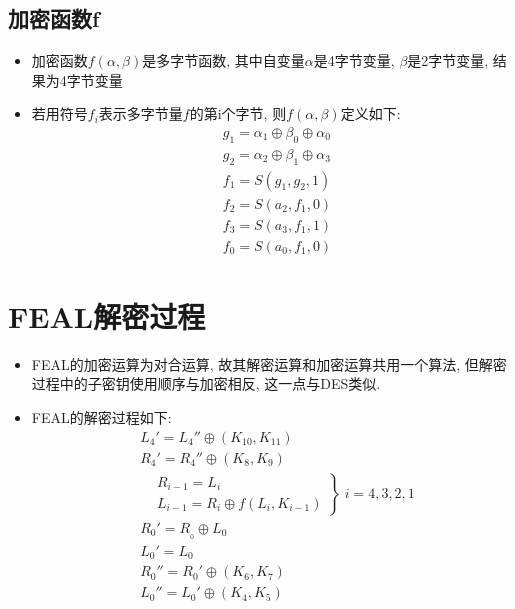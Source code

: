 \documentclass[UTF8]{ctexart}
\begin{document}
    \subsection{加密函数f}
    \begin{itemize}
        \item 加密函数$f(\alpha, \beta)$是多字节函数, 其中自变量$\alpha$是4字节变量, $\beta$是2字节变量, 结果为4字节变量
        \item 若用符号$f_i$表示多字节量$f$的第i个字节, 则$f(\alpha, \beta)$定义如下:
        $$
        \begin{aligned}
            &g_1=\alpha_1\oplus \beta_0\oplus \alpha_0\\
            &g_2=\alpha_2\oplus \beta_1\oplus \alpha_3\\
            &f_1=S(g_1, g_2, 1)\\
            &f_2=S(a_2, f_1, 0)\\
            &f_3=S(a_3, f_1, 1)\\
            &f_0=S(a_0, f_1, 0)
        \end{aligned}
        $$
    \end{itemize}

    \section{FEAL解密过程}
    \begin{itemize}
        \item FEAL的加密运算为对合运算, 故其解密运算和加密运算共用一个算法, 但解密过程中的子密钥使用顺序与加密相反, 这一点与DES类似.
        \item FEAL的解密过程如下:
        $$
        \begin{aligned}
            &L_4'=L_4''\oplus (K_{10}, K_{11})\\
            &R_4'=R_4''\oplus (K_{8}, K_{9})\\
            &\left. \begin{aligned} &R_{i-1}=L_i\\ &L_{i-1}=R_i\oplus f(L_i, K_{i-1}) \end{aligned} \right\}\;i=4,3,2,1\\
            &R_0'=R__0\oplus L_0\\
            &L_0'=L_0\\
            &R_0''=R_0'\oplus (K_6, K_7)\\
            &L_0''=L_0'\oplus (K_4, K_5)\\
        \end{aligned}
        $$
    \end{itemize}
\end{document}
